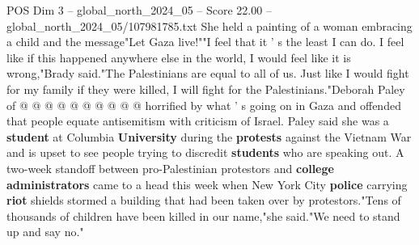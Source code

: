 \begin{textsample}{POS Dim 3 – global\_north\_2024\_05 – Score 22.00 – global\_north\_2024\_05/107981785.txt}
She held a painting of a woman embracing a child and the message"Let Gaza live!""I feel that it ' s the least I can do.
I feel like if this happened anywhere else in the world, I would feel like it is wrong,"Brady said."The Palestinians are equal to all of us.
Just like I would fight for my family if they were killed, I will fight for the Palestinians."Deborah Paley of @ @ @ @ @ @ @ @ @ @ horrified by what ' s going on in Gaza and offended that people equate antisemitism with criticism of Israel.
Paley said she was a \textbf{student} at Columbia \textbf{University} during the \textbf{protests} against the Vietnam War and is upset to see people trying to discredit \textbf{students} who are speaking out.
A two-week standoff between pro-Palestinian protestors and \textbf{college} \textbf{administrators} came to a head this week when New York City \textbf{police} carrying \textbf{riot} shields stormed a building that had been taken over by protestors."Tens of thousands of children have been killed in our name,"she said."We need to stand up and say no."

\end{textsample}
